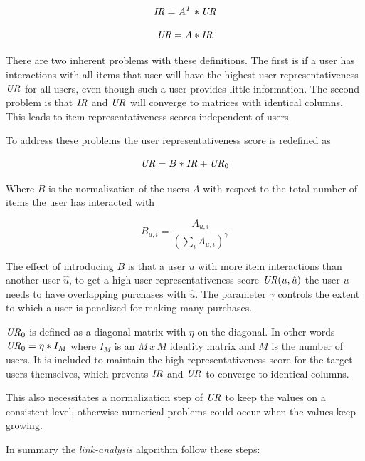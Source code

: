 \begin{equation}
    \mathit{IR} = A^T * \mathit{UR}
\end{equation}

\begin{equation}
    \mathit{UR} = A * \mathit{IR}
\end{equation}

There are two inherent problems with these definitions. The first is if a user has interactions with all items that user will have the highest user representativeness $\mathit{UR}$ for all users, even though such a user provides little information. The second problem is that $\mathit{IR}$ and $\mathit{UR}$ will converge to matrices with identical columns. This leads to item representativeness scores independent of users.

To address these problems the user representativeness score is redefined as

\begin{equation}
    \mathit{UR} = B * \mathit{IR} + \mathit{UR}_0
\end{equation}

Where $B$ is the normalization of the users $A$ with respect to the total number of items the user has interacted with

\begin{equation}
    B_{u, i} = \frac{ A_{u, i} }{ \left(\sum_{i} A_{u, i}\right)^\gamma }
\end{equation}

The effect of introducing $B$ is that a user $u$ with more item interactions than another user $\hat{u}$, to get a high user representativeness score $\mathit{UR}(u, \hat{u})$ the user $u$ needs to have overlapping purchases with $\hat{u}$. The parameter $\gamma$ controls the extent to which a user is penalized for making many purchases.

$\mathit{UR}_0$ is defined as a diagonal matrix with $\eta$ on the diagonal. In other words $\mathit{UR}_0 = \eta * I_M$ where $I_M$ is an $M\,x\,M$ identity matrix and $M$ is the number of users. It is included to maintain the high representativeness score for the target users themselves, which prevents $\mathit{IR}$ and $\mathit{UR}$ to converge to identical columns.

This also necessitates a normalization step of $\mathit{UR}$ to keep the values on a consistent level, otherwise numerical problems could occur when the values keep growing.

In summary the \textit{link-analysis} algorithm follow these steps:

